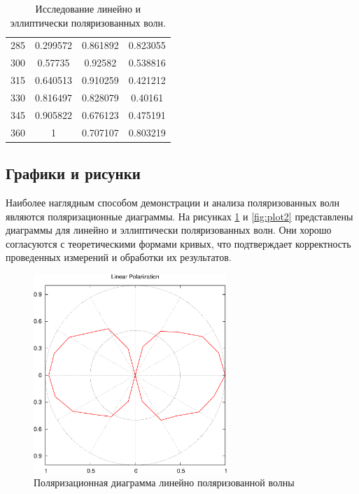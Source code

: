 \documentclass[11pt,a4paper,oneside, reqno]{amsproc}
\begin{document}
\begin{centering}
\begin{table}[h!]
\begin{tabular}{cccc}
285 & 0.299572 & 0.861892 & 0.823055\\
300 & 0.57735 & 0.92582 & 0.538816\\
315 & 0.640513 & 0.910259 & 0.421212\\
330 & 0.816497 & 0.828079 & 0.40161\\
345 & 0.905822 & 0.676123 & 0.475191\\
360 & 1 & 0.707107 & 0.803219\\
\bottomrule
\end{tabular}
\vspace{5 pt}
\caption{Исследование линейно и эллиптически поляризованных волн.} 
\label{tab:tab1}
\end{table}
\end{centering}

\subsection{Графики и рисунки}
Наиболее наглядным способом демонстрации и анализа поляризованных волн являются
поляризационные диаграммы. На рисунках \ref{fig:plot1} и \ref{fig:plot2}
представлены диаграммы для линейно и эллиптически поляризованных волн.
Они хорошо согласуются с теоретическими формами кривых, что
подтверждает корректность проведенных измерений и обработки их результатов.\\

\begin{figure}[hb!]
    \begin{center}
        \includegraphics[width=0.65\textwidth]{data1.pdf}
    \end{center}
    \caption{Поляризационная диаграмма линейно поляризованной волны}
    \label{fig:plot1}
\end{figure}
\end{document}
